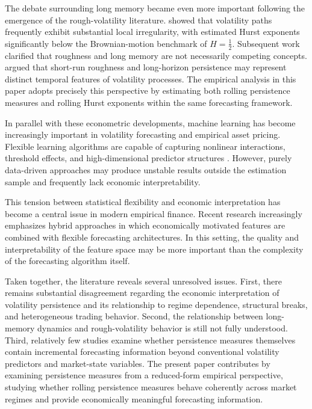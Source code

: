 \documentclass[unnumsec,webpdf,contemporary,large]{oup-authoring-template}%
\theoremstyle{thmstyleone}%
\theoremstyle{thmstyletwo}%
\theoremstyle{thmstylethree}%
\begin{document}
The debate surrounding long memory became even more important following the
emergence of the rough-volatility literature. \citet{gatheral2018volatility}
showed that volatility paths frequently exhibit substantial local
irregularity, with estimated Hurst exponents significantly below the
Brownian-motion benchmark of $H=\frac{1}{2}$. Subsequent work clarified that
roughness and long memory are not necessarily competing concepts.
\citet{bennedsen2021decoupling} argued that short-run roughness and
long-horizon persistence may represent distinct temporal features of
volatility processes. The empirical analysis in this paper adopts precisely
this perspective by estimating both rolling persistence measures and rolling
Hurst exponents within the same forecasting framework.

In parallel with these econometric developments, machine learning has become
increasingly important in volatility forecasting and empirical asset pricing.
Flexible learning algorithms are capable of capturing nonlinear interactions,
threshold effects, and high-dimensional predictor structures
\citep{breiman2001random,friedman2001greedy,gu2020empirical,hastie2009elements}.
However, purely data-driven approaches may produce unstable results outside
the estimation sample and frequently lack economic interpretability.

This tension between statistical flexibility and economic interpretation has
become a central issue in modern empirical finance. Recent research
increasingly emphasizes hybrid approaches in which economically motivated
features are combined with flexible forecasting architectures. In this
setting, the quality and interpretability of the feature space may be more
important than the complexity of the forecasting algorithm itself.

Taken together, the literature reveals several unresolved issues. First,
there remains substantial disagreement regarding the economic interpretation
of volatility persistence and its relationship to regime dependence,
structural breaks, and heterogeneous trading behavior. Second, the
relationship between long-memory dynamics and rough-volatility behavior is
still not fully understood. Third, relatively few studies examine whether
persistence measures themselves contain incremental forecasting information
beyond conventional volatility predictors and market-state variables. The
present paper contributes by examining persistence measures from a
reduced-form empirical perspective, studying whether rolling persistence
measures behave coherently across market regimes and provide economically
meaningful forecasting information.
\end{document}
